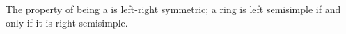 \begin{proposition} \label{proposition:ring_is_left_semisimple_if_and_only_if_right_semisimple}
The property of being a  is left-right symmetric; a ring is left semisimple if and only if it is right semisimple.
\end{proposition}